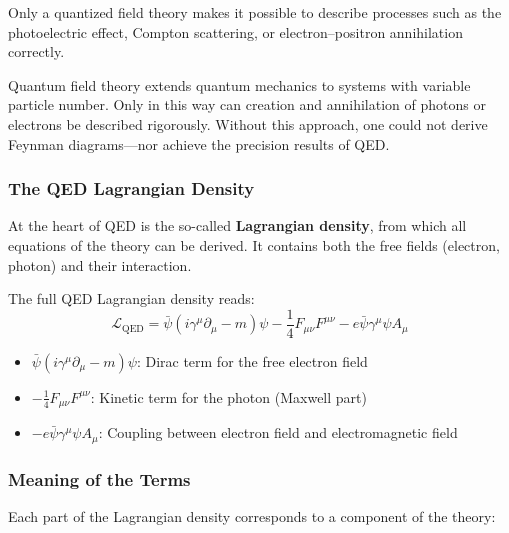 Only a quantized field theory makes it possible to describe processes such as the photoelectric effect, Compton scattering, or electron–positron annihilation correctly.
\newpage
\noindent
\vspace{0.5em}
\begin{tcolorbox}[didaktikbox, title=Why Not Simply Classical?]
	\label{box:Warum nicht einfach klassisch?}
	Quantum field theory extends quantum mechanics to systems with variable particle number. Only in this way can creation and annihilation of photons or electrons be described rigorously. Without this approach, one could not derive Feynman diagrams—nor achieve the precision results of QED.
\end{tcolorbox}

\subsubsection{The QED Lagrangian Density}

At the heart of QED is the so-called \textbf{Lagrangian density}, from which all equations of the theory can be derived. It contains both the free fields (electron, photon) and their interaction.

The full QED Lagrangian density reads:
\[
\mathcal{L}_{\text{QED}} = \bar{\psi}(i \gamma^\mu \partial_\mu - m)\psi - \frac{1}{4}F_{\mu\nu}F^{\mu\nu} - e \bar{\psi} \gamma^\mu \psi A_\mu
\]

\begin{tcolorbox}[mathebox, title=Structure of the QED Lagrangian Density]
	\label{box:Sufbau der QED-Langrangedichte}
	\begin{itemize}
		\item $\bar{\psi}(i \gamma^\mu \partial_\mu - m)\psi$: Dirac term for the free electron field
		\item $-\frac{1}{4}F_{\mu\nu}F^{\mu\nu}$: Kinetic term for the photon (Maxwell part)
		\item $-e \bar{\psi} \gamma^\mu \psi A_\mu$: Coupling between electron field and electromagnetic field
	\end{itemize}
\end{tcolorbox}

\subsubsection*{Meaning of the Terms}
Each part of the Lagrangian density corresponds to a component of the theory:

